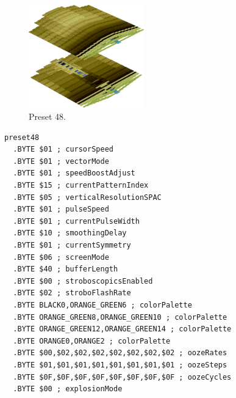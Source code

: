 \clearpage
\begin{minipage}[b]{0.48\linewidth}
\begin{figure}[H]                                                          
  \centering                                                             
  \begin{adjustbox}{width=5cm,center}                                   
  \includegraphics[width=5cm]{src/colorspace_presets/preset48-45.png}%
  \end{adjustbox}                                                        
\caption*{Preset 48.}                                           
\end{figure}                                                               
\end{minipage}
\hspace{0.1cm}
\begin{minipage}[b]{0.48\linewidth}                            
\begin{lstlisting}[basicstyle=\ttfamily\tiny]
preset48
  .BYTE $01 ; cursorSpeed
  .BYTE $01 ; vectorMode
  .BYTE $01 ; speedBoostAdjust
  .BYTE $15 ; currentPatternIndex
  .BYTE $05 ; verticalResolutionSPAC
  .BYTE $01 ; pulseSpeed
  .BYTE $01 ; currentPulseWidth
  .BYTE $10 ; smoothingDelay
  .BYTE $01 ; currentSymmetry
  .BYTE $06 ; screenMode
  .BYTE $40 ; bufferLength
  .BYTE $00 ; stroboscopicsEnabled
  .BYTE $02 ; stroboFlashRate
  .BYTE BLACK0,ORANGE_GREEN6 ; colorPalette
  .BYTE ORANGE_GREEN8,ORANGE_GREEN10 ; colorPalette
  .BYTE ORANGE_GREEN12,ORANGE_GREEN14 ; colorPalette
  .BYTE ORANGE0,ORANGE2 ; colorPalette
  .BYTE $00,$02,$02,$02,$02,$02,$02,$02 ; oozeRates
  .BYTE $01,$01,$01,$01,$01,$01,$01,$01 ; oozeSteps
  .BYTE $0F,$0F,$0F,$0F,$0F,$0F,$0F,$0F ; oozeCycles
  .BYTE $00 ; explosionMode
\end{lstlisting}
\end{minipage}

\vspace*{0.3cm}

